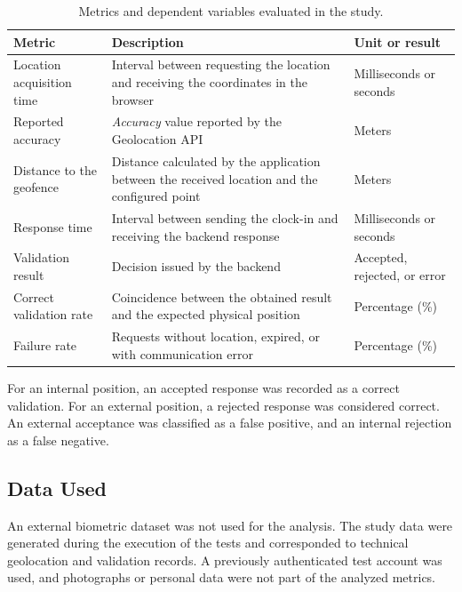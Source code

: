 \documentclass[runningheads]{llncs}
\begin{document}
\begin{table}[H] %
\centering
\caption{Metrics and dependent variables evaluated in the study.}
\label{tab:metricas_evaluacion}
\renewcommand{\arraystretch}{1.1} %
\small
\begin{tabularx}{\textwidth}{@{} >{\raggedright\arraybackslash}p{2.7cm} >{\raggedright\arraybackslash}X >{\raggedright\arraybackslash}p{2.5cm} @{}}
\toprule
\textbf{Metric} & \textbf{Description} & \textbf{Unit or result} \\
\midrule
Location acquisition time & Interval between requesting the location and receiving the coordinates in the browser & Milliseconds or seconds \\
Reported accuracy & \textit{Accuracy} value reported by the Geolocation API & Meters \\
Distance to the geofence & Distance calculated by the application between the received location and the configured point & Meters \\
Response time & Interval between sending the clock-in and receiving the backend response & Milliseconds or seconds \\
Validation result & Decision issued by the backend & Accepted, rejected, or error \\
Correct validation rate & Coincidence between the obtained result and the expected physical position & Percentage (\%) \\
Failure rate & Requests without location, expired, or with communication error & Percentage (\%) \\
\bottomrule
\end{tabularx}
\end{table}

For an internal position, an accepted response was recorded as a correct validation. For an external position, a rejected response was considered correct. An external acceptance was classified as a false positive, and an internal rejection as a false negative.

\subsection{Data Used}
An external biometric dataset was not used for the analysis. The study data were generated during the execution of the tests and corresponded to technical geolocation and validation records. A previously authenticated test account was used, and photographs or personal data were not part of the analyzed metrics.
\end{document}
